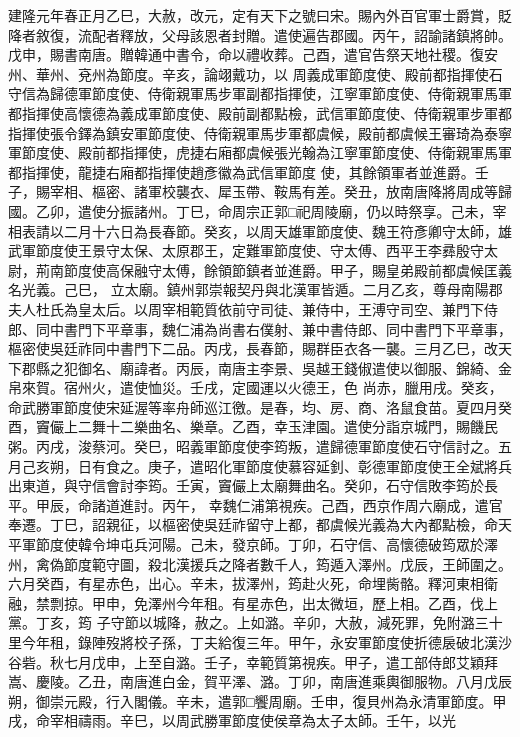 \begin{pinyinscope}
 建隆元年春正月乙巳，大赦，改元，定有天下之號曰宋。賜內外百官軍士爵賞，貶降者敘復，流配者釋放，父母該恩者封贈。遣使遍告郡國。丙午，詔諭諸鎮將帥。戊申，賜書南唐。贈韓通中書令，命以禮收葬。己酉，遣官告祭天地社稷。復安州、華州、兗州為節度。辛亥，論翊戴功，以
 周義成軍節度使、殿前都指揮使石守信為歸德軍節度使、侍衛親軍馬步軍副都指揮使，江寧軍節度使、侍衛親軍馬軍都指揮使高懷德為義成軍節度使、殿前副都點檢，武信軍節度使、侍衛親軍步軍都指揮使張令鐸為鎮安軍節度使、侍衛親軍馬步軍都虞候，殿前都虞候王審琦為泰寧軍節度使、殿前都指揮使，虎捷右廂都虞候張光翰為江寧軍節度使、侍衛親軍馬軍都指揮使，龍捷右廂都指揮使趙彥徽為武信軍節度
 使，其餘領軍者並進爵。壬子，賜宰相、樞密、諸軍校襲衣、犀玉帶、鞍馬有差。癸丑，放南唐降將周成等歸國。乙卯，遣使分振諸州。丁巳，命周宗正郭□祀周陵廟，仍以時祭享。己未，宰相表請以二月十六日為長春節。癸亥，以周天雄軍節度使、魏王符彥卿守太師，雄武軍節度使王景守太保、太原郡王，定難軍節度使、守太傅、西平王李彞殷守太尉，荊南節度使高保融守太傅，餘領節鎮者並進爵。甲子，賜皇弟殿前都虞候匡義名光義。己巳，
 立太廟。鎮州郭崇報契丹與北漢軍皆遁。二月乙亥，尊母南陽郡夫人杜氏為皇太后。以周宰相範質依前守司徒、兼侍中，王溥守司空、兼門下侍郎、同中書門下平章事，魏仁浦為尚書右僕射、兼中書侍郎、同中書門下平章事，樞密使吳廷祚同中書門下二品。丙戌，長春節，賜群臣衣各一襲。三月乙巳，改天下郡縣之犯御名、廟諱者。丙辰，南唐主李景、吳越王錢俶遣使以御服、錦綺、金帛來賀。宿州火，遣使恤災。壬戌，定國運以火德王，色
 尚赤，臘用戌。癸亥，命武勝軍節度使宋延渥等率舟師巡江徼。是春，均、房、商、洛鼠食苗。夏四月癸酉，竇儼上二舞十二樂曲名、樂章。乙酉，幸玉津園。遣使分詣京城門，賜饑民粥。丙戌，浚蔡河。癸巳，昭義軍節度使李筠叛，遣歸德軍節度使石守信討之。五月己亥朔，日有食之。庚子，遣昭化軍節度使慕容延釗、彰德軍節度使王全斌將兵出東道，與守信會討李筠。壬寅，竇儼上太廟舞曲名。癸卯，石守信敗李筠於長平。甲辰，命諸道進討。丙午，
 幸魏仁浦第視疾。己酉，西京作周六廟成，遣官奉遷。丁巳，詔親征，以樞密使吳廷祚留守上都，都虞候光義為大內都點檢，命天平軍節度使韓令坤屯兵河陽。己未，發京師。丁卯，石守信、高懷德破筠眾於澤州，禽偽節度範守圖，殺北漢援兵之降者數千人，筠遁入澤州。戊辰，王師圍之。六月癸酉，有星赤色，出心。辛未，拔澤州，筠赴火死，命埋胔骼。釋河東相衛融，禁剽掠。甲申，免澤州今年租。有星赤色，出太微垣，歷上相。乙酉，伐上黨。丁亥，筠
 子守節以城降，赦之。上如潞。辛卯，大赦，減死罪，免附潞三十里今年租，錄陣歿將校子孫，丁夫給復三年。甲午，永安軍節度使折德扆破北漢沙谷砦。秋七月戊申，上至自潞。壬子，幸範質第視疾。甲子，遣工部侍郎艾穎拜嵩、慶陵。乙丑，南唐進白金，賀平澤、潞。丁卯，南唐進乘輿御服物。八月戊辰朔，御崇元殿，行入閣儀。辛未，遣郭□饗周廟。壬申，復貝州為永清軍節度。甲戌，命宰相禱雨。辛巳，以周武勝軍節度使侯章為太子太師。壬午，以光

\end{pinyinscope}
